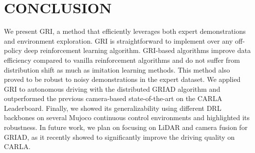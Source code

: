 \documentclass[letterpaper, 10 pt, conference]{ieeeconf}
\begin{document}
\section{CONCLUSION}
We present GRI, a method that efficiently leverages both expert demonstrations and environment exploration. GRI is straightforward to implement over any off-policy deep reinforcement learning algorithm. GRI-based algorithms improve data efficiency compared to vanilla reinforcement algorithms and do not suffer from distribution shift as much as imitation learning methods. This method also proved to be robust to noisy demonstrations in the expert dataset. We applied GRI to autonomous driving with the distributed GRIAD algorithm and outperformed the previous camera-based state-of-the-art on the CARLA Leaderboard. Finally, we showed its generalizability using different DRL backbones on several Mujoco continuous control environments and highlighted its robustness. In future work, we plan on focusing on LiDAR and camera fusion for GRIAD, as it recently showed to significantly improve the driving quality on CARLA.



























\end{document}
